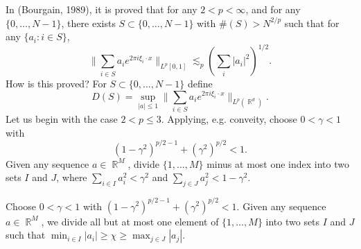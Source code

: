 \documentclass[dvipsnames,letterpaper,12pt]{article}
\numberwithin{equation}{section}
\DeclareMathOperator{\RR}{\mathbb{R}}
\numberwithin{theorem}{section}
\begin{document}
In (Bourgain, 1989), it is proved that for any $2 < p < \infty$, and for any $\{ 0, \dots, N-1 \}$, there exists $S \subset \{ 0, \dots, N-1 \}$ with $\#(S) > N^{2/p}$ such that for any $\{ a_i : i \in S \}$,
%
\[ \| \sum_{i \in S} a_i e^{2 \pi i \xi_i \cdot x} \|_{L^p[0,1]} \lesssim_p \left( \sum_i |a_i|^2 \right)^{1/2}. \]
%
How is this proved? For $S \subset \{ 0, \dots, N-1 \}$ define
%
\[ D(S) = \sup_{|a| \leq 1} \| \sum_{i \in S} a_i e^{2 \pi i \xi_i \cdot x} \|_{L^p(\RR^d)}. \]
%
Let us begin with the case $2 < p \leq 3$. Applying, e.g. conveity, choose $0 < \gamma < 1$ with
%
\[ (1 - \gamma^2)^{p/2 - 1} + (\gamma^2)^{p/2} < 1. \]
%
Given any sequence $a \in \RR^M$, divide $\{ 1, \dots, M \}$ minus at most one index into two sets $I$ and $J$, where $\sum_{i \in I} a_i^2 < \gamma^2$ and $\sum_{j \in J} a_j^2 < 1 - \gamma^2$.

Choose $0 < \gamma < 1$ with $(1 - \gamma^2)^{p/2 - 1} + (\gamma^2)^{p/2} < 1$. Given any sequence $a \in \RR^M$, we divide all but at most one element of $\{ 1, \dots, M \}$ into two sets $I$ and $J$ such that $\min_{i \in I} |a_i| \geq \chi \geq \max_{j \in J} |a_j|$.
\end{document}
